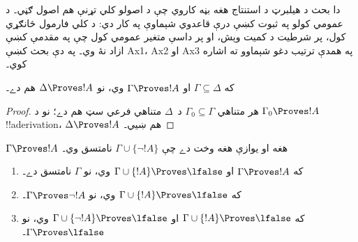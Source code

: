 \documentclass[../../../include/open-logic-section]{subfiles}
\begin{document}
      {}
      {}

دا بحث د هيلبرټ د استنتاج هغه بڼه کاروي چې د اصولو کلي تړنې هم اصول ګڼي۔ د عمومي کولو په ثبوت کښې درې قاعدوي شېماوې په کار دي: د کلي فارمول ځانګړي کول، پر شرطيت د کميت وېش، او پر داسې متغير عمومي کول چې په مقدمې کښې ازاد نۀ وي۔ په دې بحث کښې Ax1، Ax2 او Ax3 په همدې ترتيب دغو شېماوو ته اشاره کوي۔

\begin{prop}[يکنواختي] که $\Gamma \subseteq \Delta$ او $\Gamma \Proves !A$ وي، نو $\Delta \Proves !A$ هم دے۔ \end{prop}

\begin{proof} هر متناهي $\Gamma_0 \subseteq \Gamma$ د~$\Delta$ متناهي فرعي سټ هم دے؛ نو د $\Gamma_0 \Proves !A$ !!a{derivation}، $\Delta \Proves !A$ هم ښيي۔ \end{proof}

\begin{prop} $\Gamma \Proves !A$ هغه او يوازې هغه وخت دے چې $\Gamma\cup \{\lnot!A \}$ نامتسق وي۔ \end{prop}

\begin{prop} \begin{enumerate}
\item {} که $\Gamma \Proves !A$ او $\Gamma
\cup \{ !A\} \Proves \lfalse$ وي، نو $\Gamma$ نامتسق دے۔

\item {} که $\Gamma \cup \{!A\}
\Proves \lfalse$ وي، نو $\Gamma \Proves \lnot !A$۔

\item {} که $\Gamma \cup \{!A\}
\Proves \lfalse$ او $\Gamma \cup \{\lnot !A\} \Proves
\lfalse$ وي، نو $\Gamma \Proves \lfalse$۔






 \end{enumerate} \end{prop}
\end{document}
